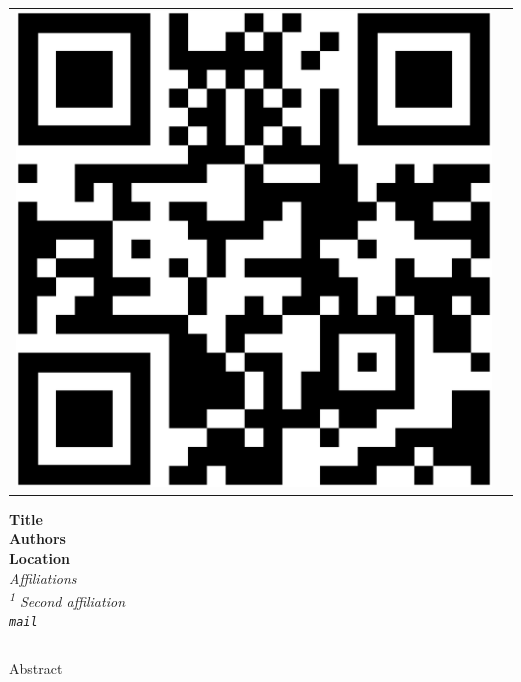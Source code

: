 \documentclass[a0paper,portrait]{baposter}
\begin{document}
\begin{poster}
{\begin{minipage}{0.12\textwidth}
\begin{tabular}{@{} l l @{}}
    \includegraphics[width=0.7\linewidth]{logos/qr-code.eps}
  \end{tabular}
  \end{minipage}
  }
%
%
{
\LARGE\bfseries{
Title}} %
{\normalsize\textbf{\vspace{0.2em}\\
\hspace{1cm}
Authors \\ Location}
\vspace{0.2em}\\[0.3cm]
\small\itshape
Affiliations\\
\textsuperscript{1} Second affiliation\\
\texttt{mail}
}
{
\begin{minipage}{0.15\textwidth}
  \hspace{-0.35cm}
  \begin{tabular}{@{} r r @{}}
  \end{tabular}
\end{minipage}
} %
{
\small
Abstract
}


\end{poster}
\end{document}
